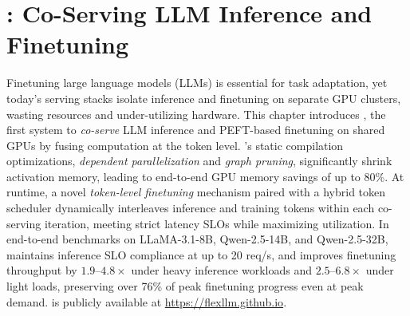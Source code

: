 \chapter{\FlexLLM: Co-Serving LLM Inference and Finetuning}
\label{ch:flexllm}

\providecommand{\flexllmLeftComment}[1]{\Statex \(\triangleright\) #1}

Finetuning large language models (LLMs) is essential for task adaptation, yet today's serving stacks isolate inference and finetuning on separate GPU clusters, wasting resources and under-utilizing hardware. This chapter introduces \FlexLLM, the first system to {\em co-serve} LLM inference and PEFT-based finetuning on shared GPUs by fusing computation at the token level. \FlexLLM's static compilation optimizations, {\em dependent parallelization} and {\em graph pruning}, significantly shrink activation memory, leading to end-to-end GPU memory savings of up to 80\%. At runtime, a novel {\em token-level finetuning} mechanism paired with a hybrid token scheduler dynamically interleaves inference and training tokens within each co-serving iteration, meeting strict latency SLOs while maximizing utilization. In end-to-end benchmarks on LLaMA-3.1-8B, Qwen-2.5-14B, and Qwen-2.5-32B, \FlexLLM maintains inference SLO compliance at up to 20 req/s, and improves finetuning throughput by $1.9$--$4.8\times$ under heavy inference workloads and $2.5$--$6.8\times$ under light loads, preserving over 76\% of peak finetuning progress even at peak demand. \FlexLLM is publicly available at \url{https://flexllm.github.io}.

